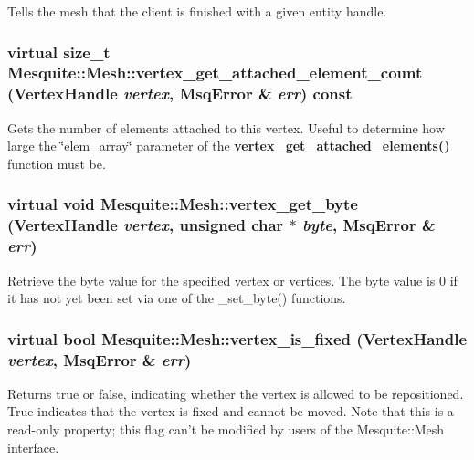 \documentclass[letter]{report}
\begin{document}
Tells the mesh that the client is finished with a given entity handle. 

\subsubsection{\setlength{\rightskip}{0pt plus 5cm}virtual size\_\-t Mesquite::Mesh::vertex\_\-get\_\-attached\_\-element\_\-count (Vertex\-Handle {\em vertex}, {\bf Msq\-Error} \& {\em err}) const\hspace{0.3cm}{\tt  [pure virtual]}}\label{classMesquite_1_1Mesh_a15}


Gets the number of elements attached to this vertex. Useful to determine how large the \char`\"{}elem\_\-array\char`\"{} parameter of the {\bf vertex\_\-get\_\-attached\_\-elements()} function must be. 

\subsubsection{\setlength{\rightskip}{0pt plus 5cm}virtual void Mesquite::Mesh::vertex\_\-get\_\-byte (Vertex\-Handle {\em vertex}, unsigned char $\ast$ {\em byte}, {\bf Msq\-Error} \& {\em err})\hspace{0.3cm}{\tt  [pure virtual]}}\label{classMesquite_1_1Mesh_a13}


Retrieve the byte value for the specified vertex or vertices. The byte value is 0 if it has not yet been set via one of the \_\-set\_\-byte() functions. 

\subsubsection{\setlength{\rightskip}{0pt plus 5cm}virtual bool Mesquite::Mesh::vertex\_\-is\_\-fixed (Vertex\-Handle {\em vertex}, {\bf Msq\-Error} \& {\em err})\hspace{0.3cm}{\tt  [pure virtual]}}\label{classMesquite_1_1Mesh_a7}

Returns true or false, indicating whether the vertex is allowed to be repositioned. True indicates that the vertex is fixed and cannot be moved. Note that this is a read-only property; this flag can't be modified by users of the Mesquite::Mesh interface. 
\end{document}
